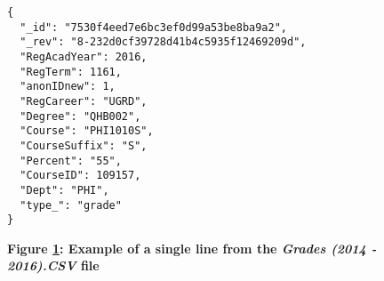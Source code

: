 \begin{figure}[H]
  \centering
  \begin{mdframed}
    \centering
    \begin{verbatim}
{
  "_id": "7530f4eed7e6bc3ef0d99a53be8ba9a2",
  "_rev": "8-232d0cf39728d41b4c5935f12469209d",
  "RegAcadYear": 2016,
  "RegTerm": 1161,
  "anonIDnew": 1,
  "RegCareer": "UGRD",
  "Degree": "QHB002",
  "Course": "PHI1010S",
  "CourseSuffix": "S",
  "Percent": "55",
  "CourseID": 109157,
  "Dept": "PHI",
  "type_": "grade"
}    
        \end{verbatim}
  \end{mdframed}
  \caption[Grade Document JSON Sample]{\textbf{Figure \ref{fig-grades-json-sample}: Example of a single line from the \textit{Grades (2014 - 2016).CSV} file}}
  \label{fig-grades-json-sample}
\end{figure}